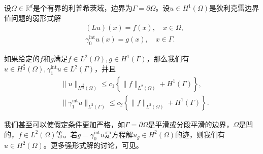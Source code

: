 \begin{theorem}
  设$\Omega \in \mathbb{R}^d$是个有界的利普希茨域，边界为$\Gamma = \partial \Omega$。设$u \in H^{1}(\Omega)$是狄利克雷边界值问题的弱形式解
  \begin{equation*}
    \begin{split}
      &(L u)(x) = f(x), \quad x \in \Omega,\\
      &\gamma_{0}^{\text{int}} u(x) = g(x), \quad x \in \Gamma.
    \end{split}
  \end{equation*}

  如果给定的$f$和$g$满足$f \in L^{2}(\Omega), g \in H^{1}(\Gamma)$，那么我们有$u \in H^{\frac{3}{2}}(\Omega), \gamma_{1}^{\text{int}} u \in L^{2}(\Gamma)$，并且
  \begin{equation*}
  \begin{split}
  &\big\| u \big\|_{H^{\frac{3}{2}}(\Omega)} \le c_1
  \left\{
  \big\| f \big\|_{L^{2}(\Omega)} + H^{1}(\Gamma)
  \right\},\\
  & \big\| \gamma_{1}^{\text{int}} u \big\|_{L^{2}(\Gamma)} \le c_2 \left\{
  \big\| f \big\|_{L^{2}(\Omega)} + H^{1}(\Gamma)
  \right\}.
  \end{split}
  \end{equation*}
\end{theorem}

我们甚至可以使假定条件更加严格，如$\Gamma = \partial \Omega$是平滑或分段平滑的边界，$\Omega$是凹的，$f \in L^{2}(\Omega)$等。若$g = \gamma_{0}^{\text{int}} u $是方程解$u_g \in H^2(\Omega)$的迹，则我们有$u \in H^2(\Omega)$。更多强形式解的讨论，可见\cite{Demkowicz:2006ww,Demkowicz:2007ur}。
